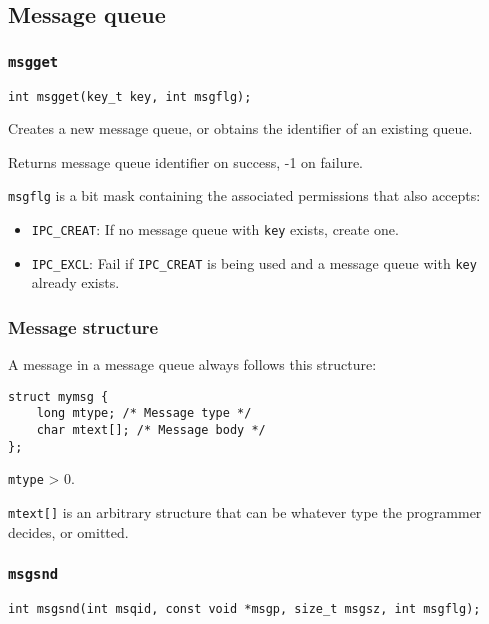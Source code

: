 \documentclass{article}
\begin{document}
\subsection{Message queue}

\subsubsection{\texttt{msgget}}

\begin{verbatim}
int msgget(key_t key, int msgflg);
\end{verbatim}

Creates a new message queue, or obtains the identifier of an existing queue.

Returns message queue identifier on success, -1 on failure.

\texttt{msgflg} is a bit mask containing the associated permissions that also accepts:

\begin{itemize}
    \item \texttt{IPC\_CREAT}: If no message queue with \texttt{key} exists, create one.
    \item \texttt{IPC\_EXCL}: Fail if \texttt{IPC\_CREAT} is being used and a message queue with \texttt{key} already exists.
\end{itemize}


\subsubsection{Message structure}

A message in a message queue always follows this structure:

\begin{verbatim}
struct mymsg {
    long mtype; /* Message type */
    char mtext[]; /* Message body */
};

\end{verbatim}

\texttt{mtype} > 0.

\texttt{mtext[]} is an arbitrary structure that can be whatever type the programmer decides, or omitted.

\subsubsection{\texttt{msgsnd}}

\begin{verbatim}
int msgsnd(int msqid, const void *msgp, size_t msgsz, int msgflg);
\end{verbatim}
\end{document}

